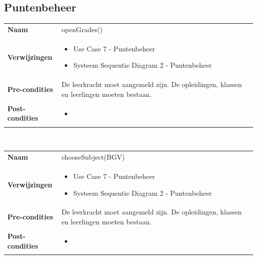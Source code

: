 \documentclass[a4paper]{article}
\begin{document}
\subsection{Puntenbeheer}
\begin{tabularx}{\textwidth}{|l X|}
    \hline
    \textbf{Naam} & openGrades() \\
    \textbf{Verwijzingen} & \begin{itemize}[leftmargin=*]
        \item Use Case 7 - Puntenbeheer
        \item Systeem Sequentie Diagram 2 - Puntenbeheer
    \end{itemize}\\
    \textbf{Pre-condities} & De leerkracht moet aangemeld zijn. De opleidingen, klassen en leerlingen moeten bestaan.\\
    \textbf{Post-condities} & \begin{itemize}[leftmargin=*]
        \item 
    \end{itemize}\\
    \hline
\end{tabularx}\\

\begin{tabularx}{\textwidth}{|l X|}
    \hline
    \textbf{Naam} & chooseSubject(BGV) \\
    \textbf{Verwijzingen} & \begin{itemize}[leftmargin=*]
        \item Use Case 7 - Puntenbeheer
        \item Systeem Sequentie Diagram 2 - Puntenbeheer
    \end{itemize}\\
    \textbf{Pre-condities} & De leerkracht moet aangemeld zijn. De opleidingen, klassen en leerlingen moeten bestaan.\\
    \textbf{Post-condities} & \begin{itemize}[leftmargin=*]
        \item 
    \end{itemize}\\
    \hline
\end{tabularx}\\
\end{document}

